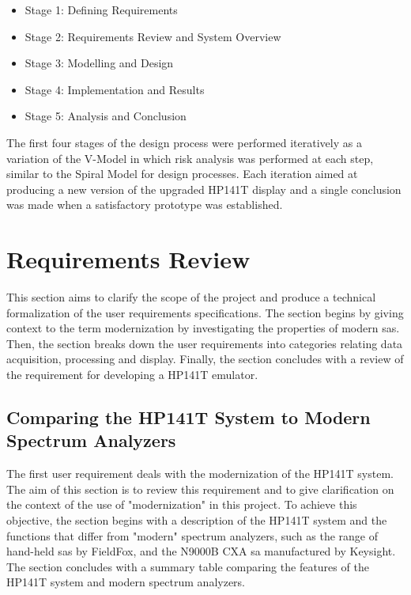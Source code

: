 \documentclass[class=report,11pt,crop=false]{standalone}
\begin{document}
	\begin{itemize}
		\item 
		Stage 1: Defining Requirements
		\item 
		Stage 2: Requirements Review and System Overview
		\item 
		Stage 3: Modelling and Design
		\item 
		Stage 4: Implementation and Results
		\item 
		Stage 5: Analysis and Conclusion 
	\end{itemize}

	The first four stages of the design process were performed iteratively as a variation of the V-Model in which risk analysis was performed at each step, similar to the Spiral Model for design processes. Each iteration aimed at producing a new version of the upgraded HP141T display and a single conclusion was made when a satisfactory prototype was established.

	\section{Requirements Review}
	
	This section aims to clarify the scope of the project and produce a technical formalization of the user requirements specifications. The section begins by giving context to the term modernization by investigating the properties of modern \acrshort{sa}s. Then, the section breaks down the user requirements into categories relating data acquisition, processing and display. Finally, the section concludes with a review of the requirement for developing a HP141T emulator. 
		
	\subsection{Comparing the HP141T System to Modern Spectrum Analyzers}
	
	The first user requirement deals with the modernization of the HP141T system. The aim of this section is to review this requirement and to give clarification on the context of the use of "modernization" in this project. To achieve this objective, the section begins with a description of the HP141T system and the functions that differ from "modern" spectrum analyzers, such as the range of hand-held \acrshort{sa}s by FieldFox, and the N9000B CXA \acrshort{sa} manufactured by Keysight\textregistered. The section concludes with a summary table comparing the features of the HP141T system and modern spectrum analyzers. 
	
\end{document}
